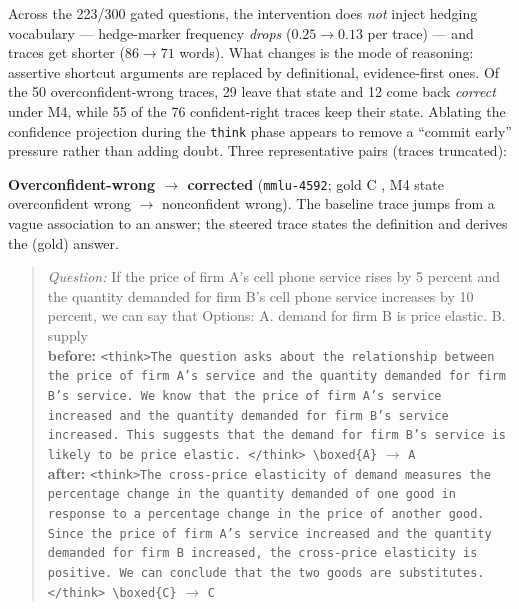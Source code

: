 Across the 223/300 gated questions, the intervention does \emph{not} inject
hedging vocabulary --- hedge-marker frequency \emph{drops} ($0.25\to0.13$ per
trace) --- and traces get shorter ($86\to71$ words). What changes is the mode
of reasoning: assertive shortcut arguments are replaced by definitional,
evidence-first ones. Of the 50 overconfident-wrong traces, 29 leave that state
and 12 come back \emph{correct} under M4, while 55 of the 76 confident-right
traces keep their state. Ablating the confidence projection during
the \texttt{think} phase appears to remove a ``commit early'' pressure rather
than adding doubt. Three representative pairs (traces truncated):

\noindent\textbf{Overconfident-wrong $\to$ corrected} (\texttt{mmlu-4592}; gold C
, M4 state overconfident wrong $\to$ nonconfident wrong). The baseline trace jumps from a vague association to an answer; the steered trace states the definition and derives the (gold) answer.
\begin{quote}\scriptsize\emph{Question:} If the price of firm A's cell phone service rises by 5 percent and the quantity demanded for firm B's cell phone service increases by 10 percent, we can say that Options: A. demand for firm B is price elastic. B. supply\\[2pt]
\textbf{before:} \texttt{\textless{}think\textgreater{}The question asks about the relationship between the price of firm A's service and the quantity demanded for firm B's service. We know that the price of firm A's service increased and the quantity demanded for firm B's service increased. This suggests that the demand for firm B's service is likely to be price elastic. \textless{}/think\textgreater{} \textbackslash boxed\{A\}} $\to$ \texttt{A}\\[2pt]
\textbf{after:} \texttt{\textless{}think\textgreater{}The cross-price elasticity of demand measures the percentage change in the quantity demanded of one good in response to a percentage change in the price of another good. Since the price of firm A's service increased and the quantity demanded for firm B increased, the cross-price elasticity is positive. We can conclude that the two goods are substitutes. \textless{}/think\textgreater{} \textbackslash boxed\{C\}} $\to$ \texttt{C}
\end{quote}

